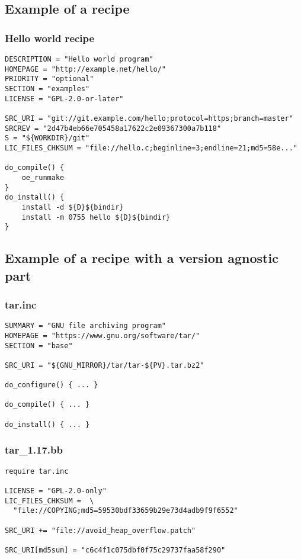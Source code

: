 \subsection{Example of a recipe}

\begin{frame}[fragile]
  \frametitle{Hello world recipe}
  \begin{block}{}
    \begin{verbatim}
DESCRIPTION = "Hello world program"
HOMEPAGE = "http://example.net/hello/"
PRIORITY = "optional"
SECTION = "examples"
LICENSE = "GPL-2.0-or-later"

SRC_URI = "git://git.example.com/hello;protocol=https;branch=master"
SRCREV = "2d47b4eb66e705458a17622c2e09367300a7b118"
S = "${WORKDIR}/git"
LIC_FILES_CHKSUM = "file://hello.c;beginline=3;endline=21;md5=58e..."

do_compile() {
    oe_runmake
}
do_install() {
    install -d ${D}${bindir}
    install -m 0755 hello ${D}${bindir}
}
    \end{verbatim}
  \end{block}
\end{frame}

\subsection{Example of a recipe with a version agnostic part}

\begin{frame}[fragile]
  \frametitle{tar.inc}
  \begin{block}{}
    \begin{verbatim}
SUMMARY = "GNU file archiving program"
HOMEPAGE = "https://www.gnu.org/software/tar/"
SECTION = "base"

SRC_URI = "${GNU_MIRROR}/tar/tar-${PV}.tar.bz2"

do_configure() { ... }

do_compile() { ... }

do_install() { ... }
    \end{verbatim}
  \end{block}
\end{frame}

\begin{frame}[fragile]
  \frametitle{tar\_1.17.bb}
  \begin{block}{}
    \begin{verbatim}
require tar.inc

LICENSE = "GPL-2.0-only"
LIC_FILES_CHKSUM =  \
  "file://COPYING;md5=59530bdf33659b29e73d4adb9f9f6552"

SRC_URI += "file://avoid_heap_overflow.patch"

SRC_URI[md5sum] = "c6c4f1c075dbf0f75c29737faa58f290"
    \end{verbatim}
  \end{block}
\end{frame}

